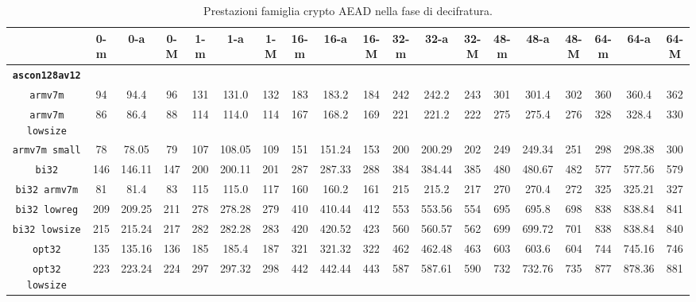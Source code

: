 \begin{landscape}
    \begin{table}[]
        \caption{Prestazioni famiglia crypto AEAD nella fase di decifratura.}
        \begin{adjustbox}{width=600pt}
            \centering
			\begin{tabular}{|c|c|c|c|c|c|c|c|c|c|c|c|c|c|c|c|c|c|c|}
				\hline
				& \textbf{0-m} & \textbf{0-a} & \textbf{0-M} & \textbf{1-m} & \textbf{1-a} & \textbf{1-M} & \textbf{16-m} & \textbf{16-a} & \textbf{16-M} & \textbf{32-m} & \textbf{32-a} & \textbf{32-M} & \textbf{48-m} & \textbf{48-a} & \textbf{48-M} & \textbf{64-m} & \textbf{64-a} & \textbf{64-M} \\
				\hline
				\texttt{\textbf{ascon128av12}} & & & & & & & & & & & & & & & & & & \\
				\hline
				\texttt{armv7m} & 94 & 94.4 & 96 & 131 & 131.0 & 132 & 183 & 183.2 & 184 & 242 & 242.2 & 243 & 301 & 301.4 & 302 & 360 & 360.4 & 362 \\
				\hline
				\texttt{armv7m lowsize} & 86 & 86.4 & 88 & 114 & 114.0 & 114 & 167 & 168.2 & 169 & 221 & 221.2 & 222 & 275 & 275.4 & 276 & 328 & 328.4 & 330 \\
				\hline
				\texttt{armv7m small} & 78 & 78.05 & 79 & 107 & 108.05 & 109 & 151 & 151.24 & 153 & 200 & 200.29 & 202 & 249 & 249.34 & 251 & 298 & 298.38 & 300 \\
				\hline
				\texttt{bi32} & 146 & 146.11 & 147 & 200 & 200.11 & 201 & 287 & 287.33 & 288 & 384 & 384.44 & 385 & 480 & 480.67 & 482 & 577 & 577.56 & 579 \\
				\hline
				\texttt{bi32 armv7m} & 81 & 81.4 & 83 & 115 & 115.0 & 117 & 160 & 160.2 & 161 & 215 & 215.2 & 217 & 270 & 270.4 & 272 & 325 & 325.21 & 327 \\
				\hline
				\texttt{bi32 lowreg} & 209 & 209.25 & 211 & 278 & 278.28 & 279 & 410 & 410.44 & 412 & 553 & 553.56 & 554 & 695 & 695.8 & 698 & 838 & 838.84 & 841 \\
				\hline
				\texttt{bi32 lowsize} & 215 & 215.24 & 217 & 282 & 282.28 & 283 & 420 & 420.52 & 423 & 560 & 560.57 & 562 & 699 & 699.72 & 701 & 838 & 838.84 & 840 \\
				\hline
				\texttt{opt32} & 135 & 135.16 & 136 & 185 & 185.4 & 187 & 321 & 321.32 & 322 & 462 & 462.48 & 463 & 603 & 603.6 & 604 & 744 & 745.16 & 746 \\
				\hline
				\texttt{opt32 lowsize} & 223 & 223.24 & 224 & 297 & 297.32 & 298 & 442 & 442.44 & 443 & 587 & 587.61 & 590 & 732 & 732.76 & 735 & 877 & 878.36 & 881 \\

\end{tabular}
\end{adjustbox}
\end{table}
\end{landscape}
